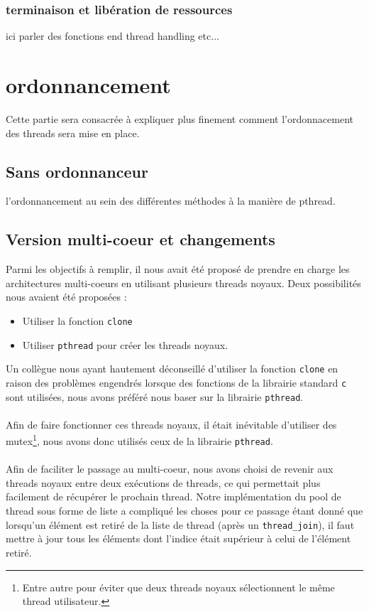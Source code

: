 \documentclass{article}
\begin{document}
			\subsubsection{terminaison et libération de ressources}
			ici parler des fonctions end thread handling etc...
		

	\section{ordonnancement}
	Cette partie sera consacrée à expliquer plus finement comment
    l'ordonnacement des threads sera mise en place.

		\subsection{Sans ordonnanceur}
		l'ordonnancement au sein des différentes méthodes à la manière
        de pthread.

		\subsection{Version multi-coeur et changements}
		Parmi les objectifs à remplir, il nous avait été proposé de prendre
        en charge les architectures multi-coeurs en utilisant plusieurs
        threads noyaux. Deux possibilités nous avaient été proposées :
        \begin{itemize}
          \item Utiliser la fonction \verb!clone!
          \item Utiliser \verb!pthread! pour créer les threads noyaux.
        \end{itemize}
        Un collègue nous ayant hautement déconseillé d'utiliser la fonction
        \verb!clone! en raison des problèmes engendrés lorsque des fonctions
        de la librairie standard \verb!c! sont utilisées, nous avons préféré
        nous baser sur la librairie \verb!pthread!.
        \paragraph{}
        Afin de faire fonctionner ces threads noyaux, il était inévitable
        d'utiliser des mutex\footnote{Entre autre pour éviter que deux
          threads noyaux sélectionnent le même thread utilisateur.}, nous
        avons donc utilisés ceux de la librairie \verb!pthread!. 
        \paragraph{}
        Afin de faciliter le passage au multi-coeur, nous avons choisi
        de revenir aux threads noyaux entre deux exécutions de threads, ce
        qui permettait plus facilement de récupérer le prochain thread. Notre
        implémentation du pool de thread sous forme de liste a compliqué les
        choses pour ce passage étant donné que lorsqu'un élément est retiré
        de la liste de thread (après un \verb!thread_join!), il faut mettre
        à jour tous les éléments dont l'indice était supérieur à celui de
        l'élément retiré.
\end{document}
